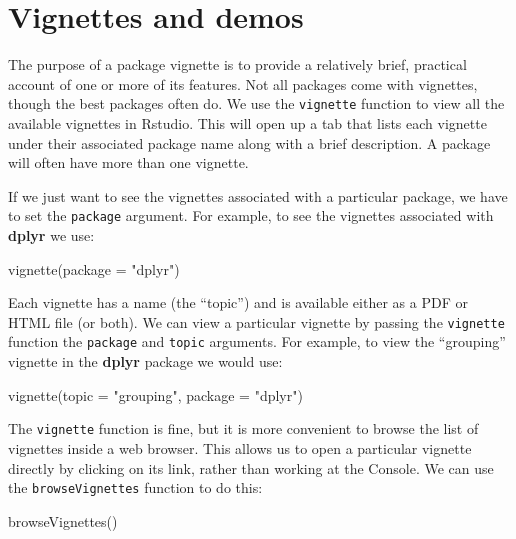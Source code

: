 \documentclass[
]{book}
\newenvironment{Shaded}{\begin{snugshade}}{\end{snugshade}}
\newcommand{\AttributeTok}[1]{\textcolor[rgb]{0.77,0.63,0.00}{#1}}
\newcommand{\FunctionTok}[1]{\textcolor[rgb]{0.00,0.00,0.00}{#1}}
\newcommand{\NormalTok}[1]{#1}
\newcommand{\StringTok}[1]{\textcolor[rgb]{0.31,0.60,0.02}{#1}}
\begin{document}
\hypertarget{vignettes}{%
\section{Vignettes and demos}\label{vignettes}}

The purpose of a package vignette is to provide a relatively brief, practical account of one or more of its features. Not all packages come with vignettes, though the best packages often do. We use the \texttt{vignette} function to view all the available vignettes in Rstudio. This will open up a tab that lists each vignette under their associated package name along with a brief description. A package will often have more than one vignette.

If we just want to see the vignettes associated with a particular package, we have to set the \texttt{package} argument. For example, to see the vignettes associated with \textbf{dplyr} we use:

\begin{Shaded}
\begin{Highlighting}[]
\FunctionTok{vignette}\NormalTok{(}\AttributeTok{package =} \StringTok{"dplyr"}\NormalTok{)}
\end{Highlighting}
\end{Shaded}

Each vignette has a name (the ``topic'') and is available either as a PDF or HTML file (or both). We can view a particular vignette by passing the \texttt{vignette} function the \texttt{package} and \texttt{topic} arguments. For example, to view the ``grouping'' vignette in the \textbf{dplyr} package we would use:

\begin{Shaded}
\begin{Highlighting}[]
\FunctionTok{vignette}\NormalTok{(}\AttributeTok{topic =} \StringTok{"grouping"}\NormalTok{, }\AttributeTok{package =} \StringTok{"dplyr"}\NormalTok{)}
\end{Highlighting}
\end{Shaded}

The \texttt{vignette} function is fine, but it is more convenient to browse the list of vignettes inside a web browser. This allows us to open a particular vignette directly by clicking on its link, rather than working at the Console. We can use the \texttt{browseVignettes} function to do this:

\begin{Shaded}
\begin{Highlighting}[]
\FunctionTok{browseVignettes}\NormalTok{()}
\end{Highlighting}
\end{Shaded}
\end{document}
